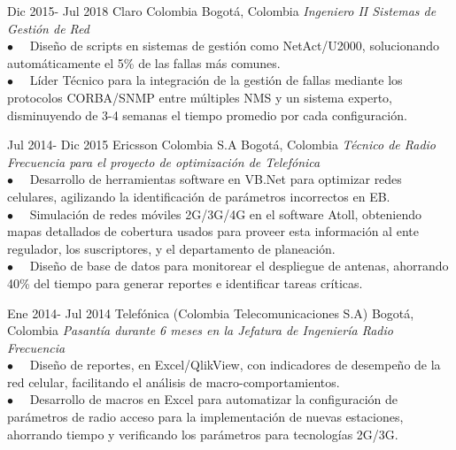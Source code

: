 \documentclass[11pt]{friggeri-cv} %
\begin{document}
\begin{entrylist}
\entry
{Dic 2015- \newline
Jul 2018}
{Claro Colombia}
{Bogotá, Colombia}
{\emph{Ingeniero II Sistemas de Gestión de Red} \\
$\bullet\quad$ Diseño de scripts en sistemas de gestión como NetAct/U2000, solucionando automáticamente el 5\% de las fallas más comunes.\\
$\bullet\quad$ Líder Técnico para la integración de la gestión de fallas mediante los protocolos CORBA/SNMP entre múltiples NMS y un sistema experto, disminuyendo de 3-4 semanas el tiempo promedio por cada configuración.
}
\end{entrylist} 
\begin{entrylist}
\entry
{Jul 2014- \newline
Dic 2015}
{Ericsson Colombia S.A}
{Bogotá, Colombia}
{\emph{Técnico de Radio Frecuencia para el proyecto de optimización de Telefónica} \\
$\bullet\quad$ Desarrollo de herramientas software en VB.Net para optimizar redes celulares, agilizando la identificación de parámetros incorrectos en EB.\\
$\bullet\quad$ Simulación de redes móviles 2G/3G/4G en el software Atoll, obteniendo mapas detallados de cobertura usados para proveer esta información al ente regulador, los suscriptores, y el departamento de planeación.\\
$\bullet\quad$ Diseño de base de datos para monitorear el despliegue de antenas, ahorrando 40\% del tiempo para generar reportes e identificar tareas críticas.
}
\end{entrylist} 
\begin{entrylist}
\entry
{Ene 2014- \newline 
Jul 2014}
{Telefónica (Colombia Telecomunicaciones S.A)}
{Bogotá, Colombia}
{\emph{Pasantía durante 6 meses en la Jefatura de Ingeniería Radio Frecuencia} \\
$\bullet\quad$ Diseño de reportes, en Excel/QlikView, con indicadores de desempeño de la red celular, facilitando el análisis de macro-comportamientos.\\
$\bullet\quad$ Desarrollo de macros en Excel para automatizar la configuración de parámetros de radio acceso para la implementación de nuevas estaciones, ahorrando tiempo y verificando los parámetros para tecnologías 2G/3G.
}
\end{entrylist} 
\end{document}
